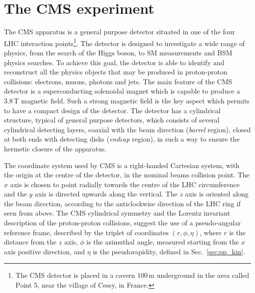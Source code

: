 \section{The CMS experiment}
\label{sec:CMS}

The CMS apparatus is a general purpose detector situated in one of the four LHC interaction points\footnote{The CMS detector is placed in a cavern 100\,m underground in the area called Point 5, near the village of Cessy, in France.}. The detector is designed to investigate a wide range of physics, from the search of the Higgs boson, to SM measurements and BSM physics searches. To achieve this goal, the detector is able to identify and reconstruct all the physics objects that may be produced in proton-proton collisions: electrons, muons, photons and jets. The main feature of the CMS detector is a superconducting solenoidal magnet which is capable to produce a $3.8$\,T magnetic field. Such a strong magnetic field is the key aspect which permits to have a compact design of the detector. The detector has a cylindrical structure, typical of general purpose detectors, which consists of several cylindrical detecting layers, coaxial with the beam direction (\emph{barrel} region), closed at both ends with detecting disks (\emph{endcap} region), in such a way to ensure the hermetic closure of the apparatus.

The coordinate system used by CMS is a right-handed Cartesian system, with the origin at the centre of the detector, in the nominal beams collision point. The $x$ axis is chosen to point radially towards the centre of the LHC circumference and the $y$ axis is directed upwards along the vertical. The $z$ axis is oriented along the beam direction, according to the anticlockwise direction of the LHC ring if seen from above. The CMS cylindrical symmetry and the Lorentz invariant description of the proton-proton collisions, suggest the use of a pseudo-angular reference frame, described by the triplet of coordinates $(r,\phi,\eta)$, where $r$ is the distance from the $z$ axis, $\phi$ is the azimuthal angle, measured starting from the $x$ axis positive direction, and $\eta$ is the pseudorapidity, defined in Sec.~\ref{sec:pp_kin}.


